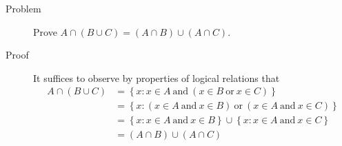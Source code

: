 \begin{description}
\item[Problem]
Prove $A \cap (B \cup C) = (A \cap B) \cup (A \cap C)$.

\item[Proof]

It suffices to observe by properties of logical relations that
\begin{equation*}
\begin{aligned}
A \cap (B \cup C) &= \left\{ x : x \in A\ \text{and}\ (x \in B\ \text{or}\ x
                       \in C) \right\}\\
                  &= \left\{ x : (x \in A\ \text{and}\ x \in B)\ \text{or}\ (x
                       \in A\ \text{and}\ x \in C) \right\}\\
                  &= \left\{ x : x \in A\ \text{and}\ x \in B\right\} \cup
                       \left\{ x : x \in A\ \text{and}\ x \in C \right\}\\
                  &= (A \cap B) \cup (A \cap C)
\end{aligned}
\end{equation*}

\end{description}
